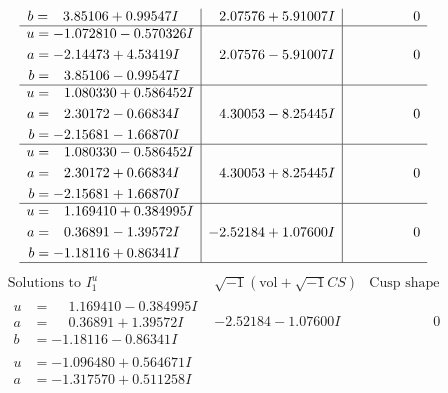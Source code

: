 \documentclass[1p]{elsarticle_modified}
\theoremstyle{definition}
\newcommand{\I}{\sqrt{-1}}
\begin{document}
$$\begin{array}{c|c|c}
\begin{aligned}
b &= \phantom{-}3.85106 + 0.99547 I\end{aligned}
 & \phantom{-}2.07576 + 5.91007 I & \phantom{-0.000000 } 0 \\ \hline\begin{aligned}
u &= -1.072810 - 0.570326 I \\
a &= -2.14473 + 4.53419 I \\
b &= \phantom{-}3.85106 - 0.99547 I\end{aligned}
 & \phantom{-}2.07576 - 5.91007 I & \phantom{-0.000000 } 0 \\ \hline\begin{aligned}
u &= \phantom{-}1.080330 + 0.586452 I \\
a &= \phantom{-}2.30172 - 0.66834 I \\
b &= -2.15681 - 1.66870 I\end{aligned}
 & \phantom{-}4.30053 - 8.25445 I & \phantom{-0.000000 } 0 \\ \hline\begin{aligned}
u &= \phantom{-}1.080330 - 0.586452 I \\
a &= \phantom{-}2.30172 + 0.66834 I \\
b &= -2.15681 + 1.66870 I\end{aligned}
 & \phantom{-}4.30053 + 8.25445 I & \phantom{-0.000000 } 0 \\ \hline\begin{aligned}
u &= \phantom{-}1.169410 + 0.384995 I \\
a &= \phantom{-}0.36891 - 1.39572 I \\
b &= -1.18116 + 0.86341 I\end{aligned}
 & -2.52184 + 1.07600 I & \phantom{-0.000000 } 0\\
 \hline 
 \end{array}$$\newpage$$\begin{array}{c|c|c}  
\text{Solutions to }I^u_{1}& \I (\text{vol} + \sqrt{-1}CS) & \text{Cusp shape}\\
 \hline 
\begin{aligned}
u &= \phantom{-}1.169410 - 0.384995 I \\
a &= \phantom{-}0.36891 + 1.39572 I \\
b &= -1.18116 - 0.86341 I\end{aligned}
 & -2.52184 - 1.07600 I & \phantom{-0.000000 } 0 \\ \hline\begin{aligned}
u &= -1.096480 + 0.564671 I \\
a &= -1.317570 + 0.511258 I \\

\end{aligned}
\end{array}$$
\end{document}
